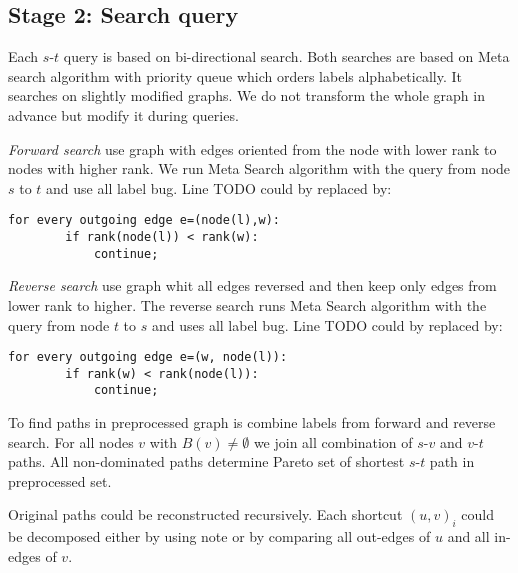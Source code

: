 
\subsection{Stage 2: Search query}

Each $s$-$t$ query is based on bi-directional search.
Both searches are based on Meta search algorithm with priority queue which orders labels
alphabetically. It searches on slightly modified graphs. We do not transform the whole
graph in advance but modify it during queries.

\emph{Forward search} use graph with edges
oriented from the node with lower rank to nodes with higher rank.
We run Meta Search algorithm with the query from node $s$ to $t$ and use all label bug.
Line TODO could by replaced by:

\begin{lstlisting}[caption={MCHp},label=list:8-6,captionpos=t,float,abovecaptionskip=-\medskipamount]
    for every outgoing edge e=(node(l),w):
    	if rank(node(l)) < rank(w):
        	continue;
\end{lstlisting}

\emph{Reverse search} use graph whit all edges reversed and then keep only edges
from lower rank to higher. 
The reverse search runs Meta Search algorithm with the query from node $t$ to $s$ and uses all label bug.
Line TODO could by replaced by:

\begin{lstlisting}[caption={MCHp},label=list:8-6,captionpos=t,float,abovecaptionskip=-\medskipamount]
    for every outgoing edge e=(w, node(l)):
    	if rank(w) < rank(node(l)):
        	continue;
\end{lstlisting}

To find paths in preprocessed graph is combine labels from forward and reverse search. 
For all nodes $v$ with $B(v) \ne \emptyset$ we join all combination of $s$-$v$ and $v$-$t$ paths. 
All non-dominated paths determine Pareto set of shortest $s$-$t$ path in preprocessed set.

Original paths could be reconstructed recursively.
Each shortcut $(u,v)_i$ could be decomposed either by using note or 
by comparing all out-edges of $u$ and all in-edges of $v$.



